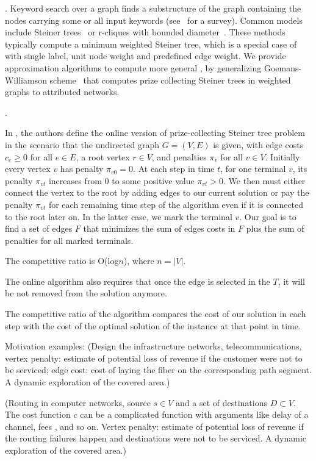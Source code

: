 .
Keyword search over a graph finds a substructure of the graph containing the nodes carrying some or all input keywords
(see~\cite{wang2010survey} for a survey).
Common models include Steiner trees~\cite{kargar2011keyword}
or r-cliques with bounded diameter~\cite{ding2007finding}.
These methods typically
compute a minimum weighted Steiner tree, which is
a special case of \abd with single label, unit node weight and predefined edge weight.
We provide approximation algorithms
to compute more general \abds,
by generalizing Goemans-Williamson scheme~\cite{goemans1995general}
that computes prize collecting Steiner trees
in weighted graphs to attributed networks.

.

In \cite{qian2011logn}, the authors define the online version of prize-collecting Steiner tree problem in the scenario that the undirected graph ${G= (V,E)}$ is given, with edge costs $c_e \geq 0$ for all ${e \in E}$, a root vertex ${r \in V}$, and penalties ${\pi_v}$ for all ${v \in V}$. Initially every vertex $v$ has penalty ${\pi_{v0} =0}$. At each step in time $t$, for one terminal $v$,  its penalty $\pi_{vt}$ increases from 0 to some positive value ${\pi_{vt} >0}$. We then must either connect the vertex to the root by adding edges to our current solution or pay the penalty $\pi_{vt}$ for each remaining time step of the algorithm even if it is connected to the root later on. In the latter case, we mark the terminal $v$.
Our goal is to find a set of edges $F$ that minimizes the sum of edges costs in $F$ plus the sum of penalties for all marked terminals.

The competitive ratio is O(log$n$), where ${n = |V|}$.

The online algorithm also requires that once the edge is selected in the $T$, it will be not removed from the solution anymore.

The competitive ratio of the algorithm compares the cost of our solution in each step with the cost of the optimal solution of the instance at that point in time.

Motivation examples:
(Design the infrastructure networks, \eg telecommunications, vertex penalty: estimate of potential loss of revenue if the customer were not to be serviced; edge cost: cost of laying the fiber on the corresponding path segment. A dynamic exploration of the covered area.)

(Routing in computer networks, source ${s \in V}$ and a set of destinations ${D \subset V}$. The cost function $c$ can be a complicated function with arguments like delay of a channel, fees , and so on. Vertex penalty: estimate of potential loss of revenue if the routing failures happen and destinations were not to be serviced. A dynamic exploration of the covered area.)


